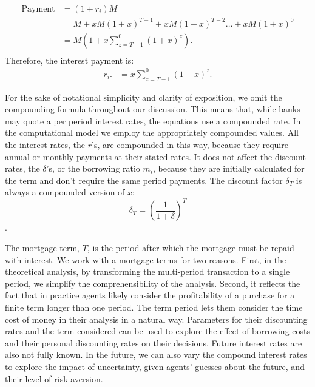 \begin{align*}
\text{Payment} &= (1+r_i)M                                 \\ 
    &= M + xM(1+x)^{T-1}+ xM(1+x)^{T-2}\dots + xM(1+x)^{0} \\
    &= M\left(1+ x\sum_{z=T-1}^0(1+x)^{z}\right).          \\ 
\end{align*}
Therefore, the interest payment is:
\begin{align*}
r_i.   &=x\sum_{z=T-1}^0(1+x)^{z}.
\end{align*}

For the sake of notational simplicity and clarity of exposition,  we omit the compounding formula throughout our discussion. This means that, while banks may quote a per period interest rates, the equations use a compounded rate. In the computational model we employ the appropriately compounded values. All %
 the interest rates, the $r$'s, are compounded in this way, because they require annual or monthly payments at their stated rates.
 It does not affect the discount rates, the $\delta$'s, or the borrowing ratio $m_i$, because they are initially calculated for the term and don't require the same period payments.
 The discount factor $\delta_T$ is always a compounded version of $x$:
 \[\delta_T=\left(\frac{1}{1+\delta}\right)^T\].

 The {mortgage term}, $T$, is the period after which the mortgage must be repaid with interest. We work with a mortgage terms for two reasons. First, in the theoretical analysis, by transforming the multi-period transaction to a single period, we simplify the comprehensibility of the analysis. Second, it reflects the fact that in practice agents  likely consider the profitability of a purchase for a finite term longer than one period. The term period lets them consider the time cost of money in their analysis in a natural way. Parameters for their discounting rates and the term considered can be used to explore the effect of borrowing costs and their personal discounting rates on their decisions. Future interest rates are also not fully known. In the future, we can also vary the compound interest rates to explore the impact of uncertainty, given agents' guesses about the future, and their level of risk aversion.

